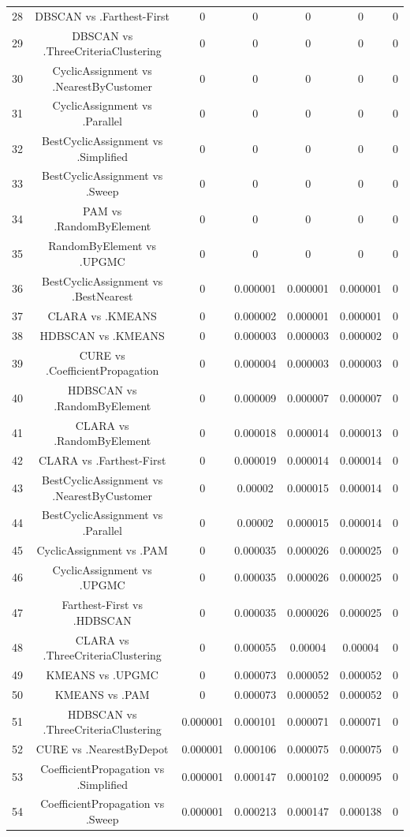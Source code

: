 \documentclass[a4paper,10pt]{article}
\begin{document}
\begin{landscape}
\begin{table}[!htp]
\begin{tabular}{ccccccc}
28&DBSCAN vs .Farthest-First&0&0&0&0&0\\
29&DBSCAN vs .ThreeCriteriaClustering&0&0&0&0&0\\
30&CyclicAssignment vs .NearestByCustomer&0&0&0&0&0\\
31&CyclicAssignment vs .Parallel&0&0&0&0&0\\
32&BestCyclicAssignment vs .Simplified&0&0&0&0&0\\
33&BestCyclicAssignment vs .Sweep&0&0&0&0&0\\
34&PAM vs .RandomByElement&0&0&0&0&0\\
35&RandomByElement vs .UPGMC&0&0&0&0&0\\
36&BestCyclicAssignment vs .BestNearest&0&0.000001&0.000001&0.000001&0\\
37&CLARA vs .KMEANS&0&0.000002&0.000001&0.000001&0\\
38&HDBSCAN vs .KMEANS&0&0.000003&0.000003&0.000002&0\\
39&CURE vs .CoefficientPropagation&0&0.000004&0.000003&0.000003&0\\
40&HDBSCAN vs .RandomByElement&0&0.000009&0.000007&0.000007&0\\
41&CLARA vs .RandomByElement&0&0.000018&0.000014&0.000013&0\\
42&CLARA vs .Farthest-First&0&0.000019&0.000014&0.000014&0\\
43&BestCyclicAssignment vs .NearestByCustomer&0&0.00002&0.000015&0.000014&0\\
44&BestCyclicAssignment vs .Parallel&0&0.00002&0.000015&0.000014&0\\
45&CyclicAssignment vs .PAM&0&0.000035&0.000026&0.000025&0\\
46&CyclicAssignment vs .UPGMC&0&0.000035&0.000026&0.000025&0\\
47&Farthest-First vs .HDBSCAN&0&0.000035&0.000026&0.000025&0\\
48&CLARA vs .ThreeCriteriaClustering&0&0.000055&0.00004&0.00004&0\\
49&KMEANS vs .UPGMC&0&0.000073&0.000052&0.000052&0\\
50&KMEANS vs .PAM&0&0.000073&0.000052&0.000052&0\\
51&HDBSCAN vs .ThreeCriteriaClustering&0.000001&0.000101&0.000071&0.000071&0\\
52&CURE vs .NearestByDepot&0.000001&0.000106&0.000075&0.000075&0\\
53&CoefficientPropagation vs .Simplified&0.000001&0.000147&0.000102&0.000095&0\\
54&CoefficientPropagation vs .Sweep&0.000001&0.000213&0.000147&0.000138&0\\

\end{tabular}
\end{table}
\end{landscape}
\end{document}
